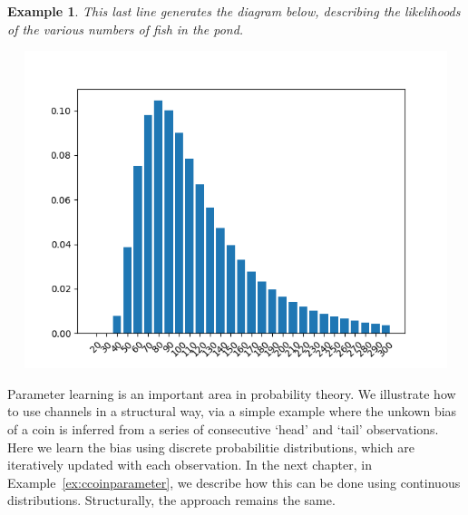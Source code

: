 \documentclass[leqno]{tufte-book} %
\newtheorem{example}[theorem]{Example}
\begin{document}
\begin{example}
\noindent This last line generates the diagram below, describing the
likelihoods of the various numbers of fish in the pond.
\begin{center}
\includegraphics[width=45em,height=25em]{Pictures/capture-recapture.png} 
\end{center}
\end{example}




Parameter learning is an important area in probability theory.  We
illustrate how to use channels in a structural way, via a simple
example where the unkown bias of a coin is inferred from a series of
consecutive `head' and `tail' observations. Here we learn the bias
using discrete probabilitie distributions, which are iteratively
updated with each observation. In the next chapter, in
Example~\ref{ex:ccoinparameter}, we describe how this can be done
using continuous distributions. Structurally, the approach remains the
same.
\end{document}
